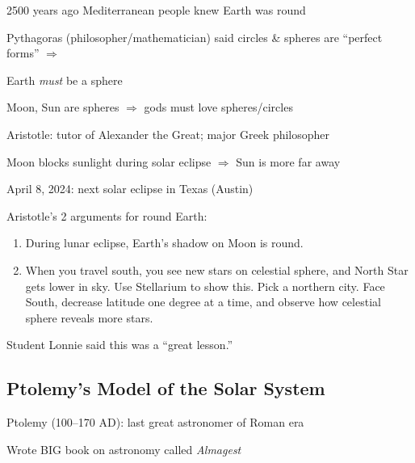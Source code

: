 \documentclass{article}
\begin{document}
2500 years ago Mediterranean people knew Earth was round

Pythagoras {\color{lightgray} (philosopher/mathematician)} said circles \& spheres are ``perfect forms'' $\Rightarrow$ 

Earth \textit{must} be a sphere

Moon, Sun are spheres $\Rightarrow$ gods must love spheres/circles

Aristotle: tutor of Alexander the Great; major Greek philosopher

Moon blocks sunlight during solar eclipse $\Rightarrow$ Sun is more far away

\begin{figure}[h!]
    \centering
\end{figure}

April 8, 2024: next solar eclipse in Texas (Austin)

Aristotle's 2 arguments for round Earth:
\vspace{-1em}

\begin{enumerate}
\setlength\itemsep{0.1ex}
    \item During lunar eclipse, Earth's shadow on Moon is round.
    \item When you travel south, you see new stars on celestial sphere, and North Star gets lower in sky. {\color{lightgray} Use Stellarium to show this. Pick a northern city. Face South, decrease latitude one degree at a time, and observe how celestial sphere reveals more stars.}
\end{enumerate}

{\color{lightgray} Student Lonnie said this was a ``great lesson.''}

\hgraydashline

\subsection*{Ptolemy's Model of the Solar System}

Ptolemy (100--170 AD): last great astronomer of Roman era

Wrote BIG book on astronomy called \textit{Almagest}
\end{document}
